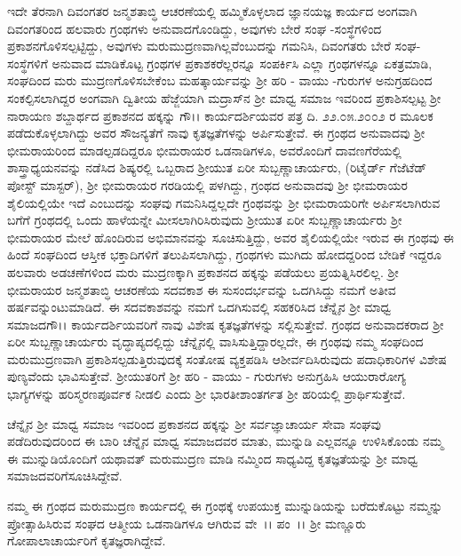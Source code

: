 ಇದೇ ತೆರನಾಗಿ ದಿವಂಗತರ ಜನ್ಮಶತಾಬ್ಧಿ ಆಚರಣೆಯಲ್ಲಿ ಹಮ್ಮಿಕೊಳ್ಳಲಾದ ಜ್ಞಾನಯಜ್ಞ ಕಾರ್ಯದ ಅಂಗವಾಗಿ ದಿವಂಗತರಿಂದ ಹಲವಾರು ಗ್ರಂಥಗಳು ಅನುವಾದಗೊಂಡಿದ್ದು, ಅವುಗಳು ಬೇರೆ ಸಂಘ -ಸಂಸ್ಥೆಗಳಿಂದ ಪ್ರಕಾಶನಗೊಳಿಸಲ್ಪಟ್ಟಿದ್ದು, ಅವುಗಳು ಮರುಮುದ್ರಣವಾಗಿಲ್ಲವೆಂಬುದನ್ನು ಗಮನಿಸಿ, ದಿವಂಗತರು ಬೇರೆ ಸಂಘ-ಸಂಸ್ಥೆಗಳಿಗೆ ಅನುವಾದ ಮಾಡಿಕೊಟ್ಟ ಗ್ರಂಥಗಳ ಪ್ರಕಾಶಕರೆಲ್ಲರನ್ನೂ ಸಂಪರ್ಕಿಸಿ ಎಲ್ಲಾ ಗ್ರಂಥಗಳನ್ನೂ ಏಕತ್ರಮಾಡಿ, ಸಂಘದಿಂದ ಮರು ಮುದ್ರಣಗೊಳಿಸಬೇಕೆಂಬ ಮಹತ್ಕಾರ್ಯವನ್ನು ಶ‍್ರೀ ಹರಿ - ವಾಯು -\-ಗುರುಗಳ ಅನುಗ್ರಹದಿಂದ ಸಂಕಲ್ಪಿಸಲಾಗಿದ್ದರ ಅಂಗವಾಗಿ ದ್ವಿತೀಯ ಹೆಜ್ಜೆಯಾಗಿ ಮದ್ರಾಸ್‌ನ ಶ‍್ರೀ ಮಾಧ್ವ ಸಮಾಜ ಇವರಿಂದ ಪ್ರಕಾಶಿಸಲ್ಪಟ್ಟ ಶ‍್ರೀ ನಾರಾಯಣ ಶಬ್ದಾರ್ಥದ ಪ್ರಕಾಶನದ ಹಕ್ಕನ್ನು ಗೌ।। ಕಾರ್ಯದರ್ಶಿಯವರ ಪತ್ರ ದಿ. ೨೨.೦೫.೨೦೦೨ ರ ಮೂಲಕ ಪಡೆದುಕೊಳ್ಳಲಾಗಿದ್ದು ಅವರ ಸೌಜನ್ಯತೆಗೆ ನಾವು ಕೃತಜ್ಞತೆಗಳನ್ನು ಅರ್ಪಿಸುತ್ತೇವೆ. ಈ ಗ್ರಂಥದ ಅನುವಾದವು ಶ‍್ರೀ ಭೀಮರಾಯರಿಂದ ಮಾಡಲ್ಪಡದಿದ್ದರೂ ಭೀಮರಾಯರ ಒಡನಾಡಿಗಳೂ, ಅವರೊಂದಿಗೆ ದಾವಣಗೆರೆಯಲ್ಲಿ ಶಾಸ್ತ್ರಾಧ್ಯಯನವನ್ನು ನಡೆಸಿದ ಶಿಷ್ಯರಲ್ಲಿ ಒಬ್ಬರಾದ ಶ‍್ರೀಯುತ ಏರೀ ಸುಬ್ಬಣ್ಣಾಚಾರ್ಯರು, (ರಿಟೈರ್ಡ್ ಗೆಜೆಟೆಡ್ ಪೋಸ್ಟ್ ಮಾಸ್ಟರ್), ಶ‍್ರೀ ಭೀಮರಾಯರ ಗರಡಿಯಲ್ಲಿ ಪಳಗಿದ್ದು, ಗ್ರಂಥದ ಅನುವಾದವು ಶ‍್ರೀ ಭೀಮರಾಯರ ಶೈಲಿ\-ಯಲ್ಲಿಯೇ ಇದೆ ಎಂಬುದನ್ನು ಸಂಘವು ಗಮನಿಸಿದ್ದಲ್ಲದೇ ಗ್ರಂಥವನ್ನು ಶ‍್ರೀ ಭೀಮ\-ರಾಯರಿಗೇ ಅರ್ಪಿಸಲಾಗಿರುವ ಬಗೆಗೆ ಗ್ರಂಥದಲ್ಲಿ ಒಂದು ಹಾಳೆಯನ್ನೇ ಮೀಸಲಾಗಿರಿಸಿರುವುದು ಶ‍್ರೀಯುತ ಏರೀ ಸುಬ್ಬಣ್ಣಾಚಾರ್ಯರು ಶ‍್ರೀ ಭೀಮರಾಯರ ಮೇಲೆ ಹೊಂದಿರುವ ಅಭಿಮಾನವನ್ನು ಸೂಚಿಸುತ್ತಿದ್ದು, ಅವರ ಶೈಲಿಯಲ್ಲಿಯೇ ಇರುವ ಈ ಗ್ರಂಥವು ಈ ಹಿಂದೆ ಸಂಘದಿಂದ ಆಸ್ತೀಕ ಭಕ್ತಾದಿಗಳಿಗೆ ತಲುಪಿಸಲಾಗಿದ್ದು, ಗ್ರಂಥಗಳು ಮುಗಿದು ಹೋದದ್ದ\-ರಿಂದ ಬೇಡಿಕೆ ಇದ್ದರೂ ಹಲವಾರು ಅಡಚಣೆಗಳಿಂದ ಮರು ಮುದ್ರಣಕ್ಕಾಗಿ ಪ್ರಕಾಶನದ ಹಕ್ಕನ್ನು ಪಡೆಯಲು ಪ್ರಯತ್ನಿಸಿರಲಿಲ್ಲ. ಶ‍್ರೀ ಭೀಮರಾಯರ ಜನ್ಮಶತಾಬ್ಧಿ ಆಚರಣೆಯ ಸದವಕಾಶ ಈ ಸುಸಂದರ್ಭವನ್ನು ಒದಗಿಸಿದ್ದು ನಮಗೆ ಅತೀವ ಹರ್ಷವನ್ನುಂಟುಮಾಡಿದೆ. ಈ ಸದವಕಾಶವನ್ನು ನಮಗೆ ಒದಗಿಸುವಲ್ಲಿ ಸಹಕರಿಸಿದ ಚೆನ್ನೈನ ಶ‍್ರೀ ಮಾಧ್ವ ಸಮಾಜದ\break ಗೌ।। ಕಾರ್ಯದರ್ಶಿ\-ಯವರಿಗೆ ನಾವು ವಿಶೇಷ ಕೃತಜ್ಞತೆಗಳನ್ನು ಸಲ್ಲಿಸುತ್ತೇವೆ. ಗ್ರಂಥದ ಅನುವಾದಕರಾದ ಶ‍್ರೀ ಏರೀ ಸುಬ್ಬಣ್ಣಾಚಾರ್ಯರು ವೃದ್ಧಾಪ್ಯದಲ್ಲಿದ್ದು ಚೆನ್ನೈನಲ್ಲಿ ವಾಸಿಸುತ್ತಿದ್ದಾರಲ್ಲದೇ, ಈ ಗ್ರಂಥವು ನಮ್ಮ ಸಂಘದಿಂದ ಮರುಮುದ್ರಣವಾಗಿ ಪ್ರಕಾಶಿಸಲ್ಪಡುತ್ತಿರುವುದಕ್ಕೆ ಸಂತೋಷ ವ್ಯಕ್ತಪಡಿಸಿ ಆಶೀರ್ವದಿಸಿರುವುದು ಪದಾಧಿಕಾರಿಗಳ ವಿಶೇಷ ಪುಣ್ಯ\-ವೆಂದು ಭಾವಿಸು\-ತ್ತೇವೆ. ಶ‍್ರೀಯುತರಿಗೆ ಶ‍್ರೀ ಹರಿ - ವಾಯು - ಗುರುಗಳು ಅನುಗ್ರಹಿಸಿ ಆಯುರಾ\-ರೋಗ್ಯ ಭಾಗ್ಯಗಳನ್ನು ಹರಿಸ್ಮರಣಪೂರ್ವಕ ನೀಡಲಿ ಎಂದು ಶ‍್ರೀ ಭಾರತೀ\-ಶಾಂತರ್ಗತ ಶ‍್ರೀ ಹರಿಯಲ್ಲಿ ಪ್ರಾರ್ಥಿಸುತ್ತೇವೆ.

ಚೆನ್ನೈನ ಶ‍್ರೀ ಮಾಧ್ವ ಸಮಾಜ ಇವರಿಂದ ಪ್ರಕಾಶನದ ಹಕ್ಕನ್ನು ಶ‍್ರೀ ಸರ್ವಜ್ಞಾಚಾರ್ಯ ಸೇವಾ ಸಂಘವು ಪಡೆದಿರುವುದರಿಂದ ಈ ಬಾರಿ ಚೆನ್ನೈನ ಮಾಧ್ವ ಸಮಾಜದವರ ಮಾತು, ಮುನ್ನುಡಿ ಎಲ್ಲವನ್ನೂ ಉಳಿಸಿಕೊಂಡು ನಮ್ಮ ಈ ಮುನ್ನುಡಿಯೊಂದಿಗೆ ಯಥಾವತ್ ಮರುಮುದ್ರಣ ಮಾಡಿ ನಮ್ಮಿಂದ ಸಾಧ್ಯವಿದ್ದ ಕೃತಜ್ಞತೆಯನ್ನು ಶ‍್ರೀ ಮಾಧ್ವ ಸಮಾಜದವರಿಗೆ\break ಸೂಚಿಸಿದ್ದೇವೆ.

ನಮ್ಮ ಈ ಗ್ರಂಥದ ಮರುಮುದ್ರಣ ಕಾರ್ಯದಲ್ಲಿ ಈ ಗ್ರಂಥಕ್ಕೆ ಉಪಯುಕ್ತ ಮುನ್ನುಡಿಯನ್ನು ಬರೆದುಕೊಟ್ಟು ನಮ್ಮನ್ನು ಪ್ರೋತ್ಸಾಹಿಸಿರುವ ಸಂಘದ ಆತ್ಮೀಯ ಒಡನಾಡಿಗಳೂ ಆಗಿರುವ ವೇ~।। ಪಂ~।। ಶ‍್ರೀ ಮಣ್ಣೂರು ಗೋಪಾಲಾಚಾರ್ಯರಿಗೆ ಕೃತಜ್ಞರಾಗಿದ್ದೇವೆ.

